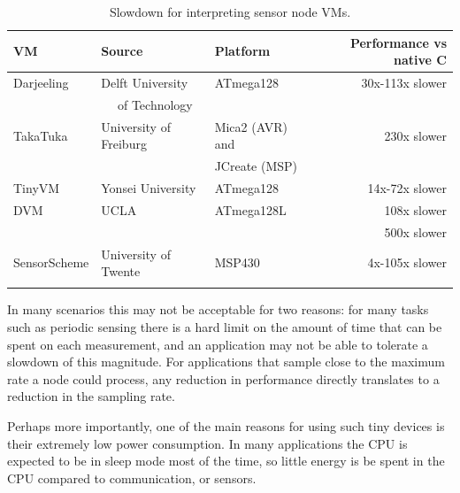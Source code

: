 \begin{table}[]
\centering
\caption{Slowdown for interpreting sensor node VMs.}
\label{tbl-slowdown-for-sensornode-vms}
\begin{tabular}{lllr}
\toprule
VM              & Source                           & Platform                   & Performance vs native C \\
\midrule
Darjeeling      & Delft University                 & ATmega128                  & 30x-113x slower \cite{Brouwers:2009cj} \\
                & ~~ of Technology                 &                            & \\
TakaTuka        & University of Freiburg           & Mica2 (AVR) and            & 230x slower \cite{Ellul:2012thesis} \\
                &                                  & JCreate (MSP)                           & \\
TinyVM          & Yonsei University                & ATmega128                  & 14x-72x slower \cite{Hong:2009gc} \\
DVM             & UCLA                             & ATmega128L                 & 108x slower \cite{Balani:2006} \\
                &                                  &                            & 500x slower \cite{Kumar:2007ge} \\
SensorScheme    & University of Twente             & MSP430                     & 4x-105x slower \cite{Evers:2010ur} \\
                &                                  &                            & \\
\bottomrule
\end{tabular}
\end{table}

In many scenarios this may not be acceptable for two reasons: for many tasks such as periodic sensing there is a hard limit on the amount of time that can be spent on each measurement, and an application may not be able to tolerate a slowdown of this magnitude. For applications that sample close to the maximum rate a node could process, any reduction in performance directly translates to a reduction in the sampling rate.

Perhaps more importantly, one of the main reasons for using such tiny devices is their extremely low power consumption. In many applications the CPU is expected to be in sleep mode most of the time, so little energy is be spent in the CPU compared to communication, or sensors.

